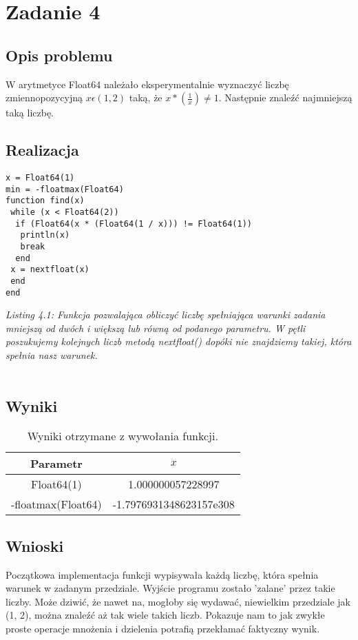 \documentclass[]{article}
\begin{document}
\section{Zadanie 4}
\subsection{Opis problemu}
W arytmetyce Float64 należało eksperymentalnie wyznaczyć liczbę zmiennopozycyjną $x \epsilon (1, 2)$ taką, że $x * (\frac{1}{x}) \not = 1$. Następnie znaleźć najmniejszą taką liczbę.
\newpage
\subsection{Realizacja}
\begin{lstlisting}
x = Float64(1)
min = -floatmax(Float64)
function find(x)
 while (x < Float64(2))
  if (Float64(x * (Float64(1 / x))) != Float64(1))
   println(x)
   break
  end
 x = nextfloat(x)
 end
end
\end{lstlisting}
\textit{Listing 4.1: Funkcja pozwalająca obliczyć liczbę spełniająca warunki zadania mniejszą od dwóch i większą lub równą od podanego parametru. W pętli poszukujemy kolejnych liczb metodą nextfloat() dopóki nie znajdziemy takiej, która spełnia nasz warunek.}
\\\\
\subsection{Wyniki}
\begin{table}[h]
	\centering
	\begin{tabular}{||c c||} 
		\hline
		Parametr & $x$ \\ [0.5ex] 
		\hline\hline
		Float64(1) &  1.000000057228997\\ 
		-floatmax(Float64) & -1.7976931348623157e308\\
		\hline
	\end{tabular}
	\caption{Wyniki otrzymane z wywołania funkcji.}
\end{table}
\subsection{Wnioski}
Początkowa implementacja funkcji wypisywała każdą liczbę, która spełnia warunek w zadanym przedziale. Wyjście programu zostało 'zalane' przez takie liczby. Może dziwić, że nawet na, mogłoby się wydawać, niewielkim przedziale jak (1, 2), można znaleźć aż tak wiele takich liczb. Pokazuje nam to jak zwykłe proste operacje mnożenia i dzielenia potrafią przekłamać faktyczny wynik.
\end{document}
